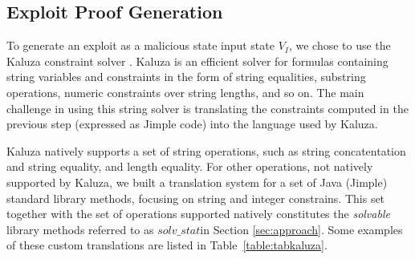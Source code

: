 
\subsection{Exploit Proof Generation}
 \label{section:kaluzaTranslation}

To generate an exploit as a malicious state input state $V_I$, we chose to use the Kaluza constraint solver \cite{kaluza}. Kaluza is an efficient solver for formulas containing string variables and constraints in the form of string equalities, substring operations, numeric constraints over string lengths, and so on. The main challenge in using this string solver is translating the constraints computed in the previous step (expressed as Jimple code) into the language used by Kaluza.

Kaluza natively supports a set of string operations, such as string concatentation and string equality, and length equality. For other operations, not natively supported by Kaluza, we built a translation system for a set of Java (Jimple) standard library methods, focusing on string and integer constrains. This set together with the set of operations supported natively constitutes the \emph{solvable} library methods referred to as $solv\_stat$in Section \ref{sec:approach}.  Some examples of these custom translations are listed in Table~\ref{table:tabkaluza}.

